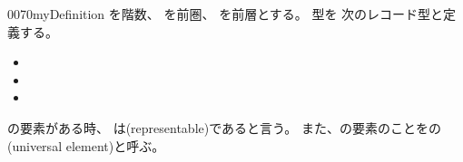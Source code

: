 \documentclass[index]{subfiles}
\begin{document}
\begin{myBlock}{0070}{myDefinition}
  を階数、
  を前圏、
  を前層とする。
  型を
  次のレコード型と定義する。
  \begin{itemize}
  \item {}
  \item {}
  \item {}
  \end{itemize}
  の要素がある時、
  は(representable)であると言う。
  また、の要素のことをの
  (universal element)と呼ぶ。
\end{myBlock}
\end{document}
